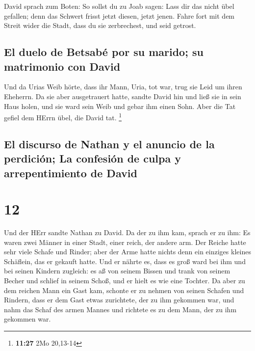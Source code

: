  David sprach zum Boten: So sollst du zu Joab sagen: Lass
dir das nicht übel gefallen; denn das Schwert frisst jetzt diesen, jetzt
jenen. Fahre fort mit dem Streit wider die Stadt, dass du sie
zerbrechest, und seid getrost.

\hypertarget{el-duelo-de-betsabuxe9-por-su-marido-su-matrimonio-con-david}{%
\subsection{El duelo de Betsabé por su marido; su matrimonio con
David}\label{el-duelo-de-betsabuxe9-por-su-marido-su-matrimonio-con-david}}

 Und da Urias Weib hörte, dass ihr Mann, Uria, tot war,
trug sie Leid um ihren Eheherrn.  Da sie aber
ausgetrauert hatte, sandte David hin und ließ sie in sein Haus holen,
und sie ward sein Weib und gebar ihm einen Sohn. Aber die Tat gefiel dem
HErrn übel, die David tat. \footnote{\textbf{11:27} 2Mo 20,13-14}

\hypertarget{el-discurso-de-nathan-y-el-anuncio-de-la-perdiciuxf3n-la-confesiuxf3n-de-culpa-y-arrepentimiento-de-david}{%
\subsection{El discurso de Nathan y el anuncio de la perdición; La
confesión de culpa y arrepentimiento de
David}\label{el-discurso-de-nathan-y-el-anuncio-de-la-perdiciuxf3n-la-confesiuxf3n-de-culpa-y-arrepentimiento-de-david}}

\hypertarget{section-11}{%
\section{12}\label{section-11}}

 Und der HErr sandte Nathan zu David. Da der zu ihm kam,
sprach er zu ihm: Es waren zwei Männer in einer Stadt, einer reich, der
andere arm.  Der Reiche hatte sehr viele Schafe und
Rinder;  aber der Arme hatte nichts denn ein einziges
kleines Schäflein, das er gekauft hatte. Und er nährte es, dass es groß
ward bei ihm und bei seinen Kindern zugleich: es aß von seinem Bissen
und trank von seinem Becher und schlief in seinem Schoß, und er hielt es
wie eine Tochter.  Da aber zu dem reichen Mann ein Gast
kam, schonte er zu nehmen von seinen Schafen und Rindern, dass er dem
Gast etwas zurichtete, der zu ihm gekommen war, und nahm das Schaf des
armen Mannes und richtete es zu dem Mann, der zu ihm gekommen war.

